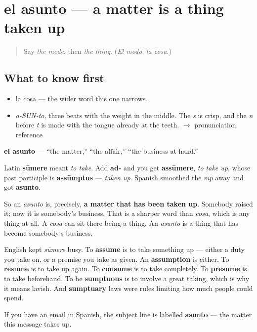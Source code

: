 \section[el asunto]{el asunto — a matter is a thing taken up}

\label{lesson:ES-C331-asunto}



\begin{quote}
Say \emph{the mode}, then \emph{the thing}. (\emph{El modo}; \emph{la cosa}.)
\end{quote}

\subsection*{What to know first}
\begin{itemize}
\raggedright
  \item la cosa — the wider word this one narrows.
\end{itemize}

\begin{sounds}
\begin{itemize}
\raggedright
  \item \emph{a-SUN-to}, three beats with the weight in the middle. The \emph{s} is crisp, and the \emph{n} before \emph{t} is made with the tongue already at the teeth. $\to$ pronunciation reference
\end{itemize}
\end{sounds}

\begin{cousinweb}
\textbf{el asunto} — \textquotedblleft{}the matter,\textquotedblright{} \textquotedblleft{}the affair,\textquotedblright{} \textquotedblleft{}the business at hand.\textquotedblright{}

Latin \textbf{sūmere} meant \emph{to take}. Add \textbf{ad-} and you get \textbf{assūmere}, \emph{to take up}, whose past participle is \textbf{assūmptus} — \emph{taken up}. Spanish smoothed the \emph{mp} away and got \textbf{asunto}.

So an \emph{asunto} is, precisely, \textbf{a matter that has been taken up}. Somebody raised it; now it is somebody's business. That is a sharper word than \emph{cosa}, which is any thing at all. A \emph{cosa} can sit there being a thing. An \emph{asunto} is a thing that has become somebody's business.

English kept \emph{sūmere} busy. To \textbf{assume} is to take something up — either a duty you take on, or a premise you take as given. An \textbf{assumption} is either. To \textbf{resume} is to take up again. To \textbf{consume} is to take completely. To \textbf{presume} is to take beforehand. To be \textbf{sumptuous} is to involve a great taking, which is why it means lavish. And \textbf{sumptuary} laws were rules limiting how much people could spend.

If you have an email in Spanish, the subject line is labelled \textbf{asunto} — the matter this message takes up.
\end{cousinweb}

